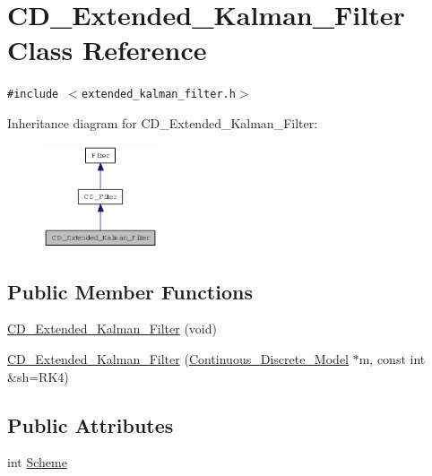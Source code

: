 \hypertarget{class_c_d___extended___kalman___filter}{
\section{CD\_\-Extended\_\-Kalman\_\-Filter Class Reference}
\label{class_c_d___extended___kalman___filter}
}
{\tt \#include $<$extended\_\-kalman\_\-filter.h$>$}

Inheritance diagram for CD\_\-Extended\_\-Kalman\_\-Filter:\nopagebreak
\begin{figure}[H]
\begin{center}
\leavevmode
\includegraphics[width=96pt]{class_c_d___extended___kalman___filter__inherit__graph}
\end{center}
\end{figure}
\subsection*{Public Member Functions}
\begin{CompactItemize}
\item 
\hyperlink{class_c_d___extended___kalman___filter_a513c87055e01494c950391047fe8e78}{CD\_\-Extended\_\-Kalman\_\-Filter} (void)
\item 
\hyperlink{class_c_d___extended___kalman___filter_01743a0e2ac32830a65da4dc7885cc20}{CD\_\-Extended\_\-Kalman\_\-Filter} (\hyperlink{class_continuous___discrete___model}{Continuous\_\-Discrete\_\-Model} $\ast$m, const int \&sh=RK4)
\end{CompactItemize}
\subsection*{Public Attributes}
\begin{CompactItemize}
\item 
int \hyperlink{class_c_d___extended___kalman___filter_20c7448afdc652603781e4da3385e2b3}{Scheme}
\end{CompactItemize}
